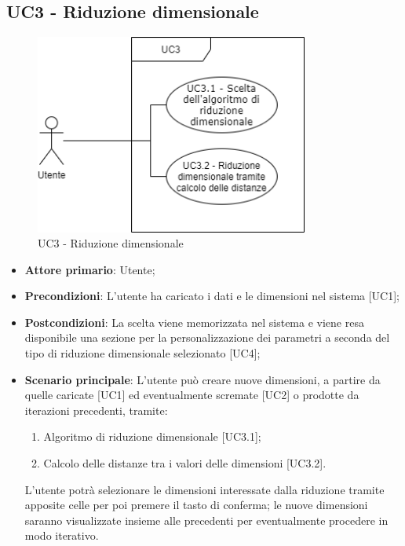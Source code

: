 \subsection{UC3 - Riduzione dimensionale}
\begin{figure}[h]
\includegraphics[width=9cm]{section/Images/UC3.png}
\centering
\caption{UC3 - Riduzione dimensionale}
\end{figure}
\begin{itemize}
	\item \textbf{Attore primario}: Utente;
	\item \textbf{Precondizioni}: L'utente ha caricato i dati e le dimensioni nel sistema [UC1];
	\item \textbf{Postcondizioni}: La scelta viene memorizzata nel sistema e viene resa disponibile una sezione per la personalizzazione dei parametri a seconda del tipo di riduzione dimensionale selezionato [UC4];
	\item \textbf{Scenario principale}: L'utente può creare nuove dimensioni, a partire da quelle caricate [UC1] ed eventualmente scremate [UC2] o prodotte da iterazioni precedenti, tramite:
	\begin{enumerate}[1.]
		\item Algoritmo di riduzione dimensionale [UC3.1];
		\item Calcolo delle distanze tra i valori delle dimensioni [UC3.2].
	\end{enumerate}
	L'utente potrà selezionare le dimensioni interessate dalla riduzione tramite apposite celle per poi premere il tasto di conferma; le nuove dimensioni saranno visualizzate insieme alle precedenti per eventualmente procedere in modo iterativo.
\end{itemize}